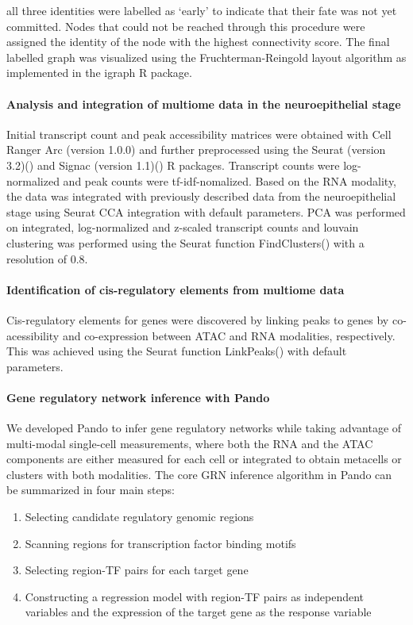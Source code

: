 all three identities were labelled as ‘early’ to indicate that their fate was not yet committed. Nodes that could not be reached through this procedure were assigned the identity of the node with the highest connectivity score. The final labelled graph was visualized using the Fruchterman-Reingold layout algorithm as implemented in the igraph R package.
 
\paragraph{Analysis and integration of multiome data in the neuroepithelial stage}
Initial transcript count and peak accessibility matrices were obtained with Cell Ranger Arc (version 1.0.0) and further preprocessed using the Seurat (version 3.2)(\cite{stuart_comprehensive_2019}) and Signac (version 1.1)(\cite{stuart_multimodal_2020}) R packages. Transcript counts were log-normalized and peak counts were tf-idf-nomalized. Based on the RNA modality, the data was integrated with previously described data from the neuroepithelial stage using Seurat CCA integration with default parameters. PCA was performed on integrated, log-normalized and z-scaled transcript counts and louvain clustering was performed using the Seurat function FindClusters() with a resolution of 0.8.
 
\paragraph{Identification of cis-regulatory elements from multiome data}
Cis-regulatory elements for genes were discovered by linking peaks to genes by co-acessibility and co-expression between ATAC and RNA modalities, respectively. This was achieved using the Seurat function LinkPeaks() with default parameters.
 
\paragraph{Gene regulatory network inference with Pando}
We developed Pando to infer gene regulatory networks while taking advantage of multi-modal single-cell measurements, where both the RNA and the ATAC components are either measured for each cell or integrated to obtain metacells or clusters with both modalities. The core GRN inference algorithm in Pando can be summarized in four main steps:

\begin{enumerate}
\item Selecting candidate regulatory genomic regions \
\item Scanning regions for transcription factor binding motifs \
\item Selecting region-TF pairs for each target gene \
\item Constructing a regression model with region-TF pairs as independent variables and the expression of the target gene as the response variable
\end{enumerate} 

